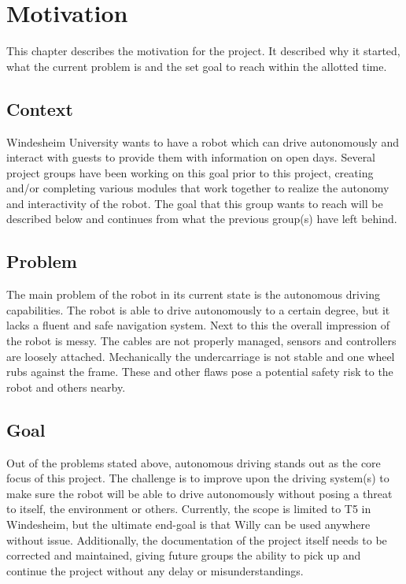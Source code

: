 \section{Motivation}
This chapter describes the motivation for the project. 
It described why it started, what the current problem is and the set goal to reach within the allotted time.

\subsection{Context}
Windesheim University wants to have a robot which can drive autonomously and interact with guests to provide them with information on open days.
Several project groups have been working on this goal prior to this project, creating and/or completing various modules that work together to realize the autonomy and interactivity of the robot.
The goal that this group wants to reach will be described below and continues from what the previous group(s) have left behind.

\subsection{Problem}
The main problem of the robot in its current state is the autonomous driving capabilities. 
The robot is able to drive autonomously to a certain degree, but it lacks a fluent and safe navigation system. 
Next to this the overall impression of the robot is messy. 
The cables are not properly managed, sensors and controllers are loosely attached. 
Mechanically the undercarriage is not stable and one wheel rubs against the frame. 
These and other flaws pose a potential safety risk to the robot and others nearby. 

\subsection{Goal}
Out of the problems stated above, autonomous driving stands out as the core focus of this project. 
The challenge is to improve upon the driving system(s) to make sure the robot will be able to drive autonomously without posing a threat to itself, the environment or others.
Currently, the scope is limited to T5 in Windesheim, but the ultimate end-goal is that Willy can be used anywhere without issue.
Additionally, the documentation of the project itself needs to be corrected and maintained, giving future groups the ability to pick up and continue the project without any delay or misunderstandings.


